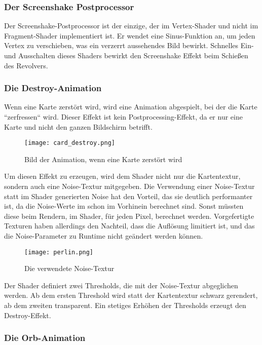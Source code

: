 \subsubsection{Der Screenshake Postprocessor}

Der Screenshake-Postprocessor ist der einzige, der im Vertex-Shader und nicht im Fragment-Shader implementiert ist.
Er wendet eine Sinus-Funktion an, um jeden Vertex zu verschieben, was ein verzerrt aussehendes Bild bewirkt.
Schnelles Ein- und Ausschalten dieses Shaders bewirkt den Screenshake Effekt beim Schießen des Revolvers.

\subsubsection{Die Destroy-Animation}

Wenn eine Karte zerstört wird, wird eine Animation abgespielt, bei der die Karte ``zerfressen`` wird.
Dieser Effekt ist kein Postprocessing-Effekt, da er nur eine Karte und nicht den ganzen Bildschirm betrifft.

\begin{figure}[H]
    \centering
    \texttt{[image: card\_destroy.png]}
    \caption{Bild der Animation, wenn eine Karte zerstört wird}
\end{figure}

Um diesen Effekt zu erzeugen, wird dem Shader nicht nur die Kartentextur, sondern auch eine Noise-Textur mitgegeben.
Die Verwendung einer Noise-Textur statt im Shader generierten Noise hat den Vorteil, das sie deutlich performanter ist,
da die Noise-Werte im schon im Vorhinein berechnet sind.
Sonst müssten diese beim Rendern, im Shader, für jeden Pixel, berechnet werden.
Vorgefertigte Texturen haben allerdings den Nachteil, dass die Auflösung limitiert ist, und das die Noise-Parameter
zu Runtime nicht geändert werden können.

\begin{figure}[H]
    \centering
    \texttt{[image: perlin.png]}
    \caption{Die verwendete Noise-Textur}
\end{figure}

Der Shader definiert zwei Thresholds, die mit der Noise-Textur abgeglichen werden.
Ab dem ersten Threshold wird statt der Kartentextur schwarz gerendert, ab dem zweiten transparent.
Ein stetiges Erhöhen der Thresholds erzeugt den Destroy-Effekt.

\subsubsection{Die Orb-Animation}


